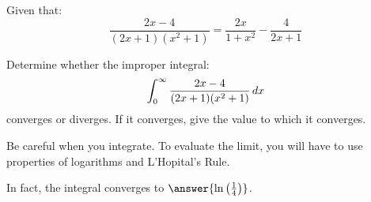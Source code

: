 \documentclass{ximera}
\author{Jim Talamo}
\begin{document}
\begin{exercise}
Given that: 
\[ \frac{2x-4}{(2x+1)(x^2+1)} = \dfrac{2x}{1+x^2}-\dfrac{4}{2x+1} \]

Determine whether the improper integral:
\[ \displaystyle \int_0^{\infty}\frac{2x-4}{(2x+1)(x^2+1)} \mathop{}\!d x \]
 converges or diverges.  If it converges, give the value to which it converges.  

\begin{multipleChoice}
\end{multipleChoice}

\begin{hint}
Be careful when you integrate.  To evaluate the limit, you will have to use properties of logarithms and L'Hopital's Rule.
\end{hint}

\begin{exercise}
In fact, the integral converges to $\answer{ \ln\left(\frac{1}{4}\right) }$.
\end{exercise}
\end{exercise}
\end{document}
